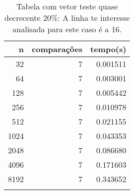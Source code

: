 \begin{table}[ht]
\centering
\begin{tabular}{rrr} \toprule
        n &    comparações &       tempo(s) \\ \midrule
      32  &              7 &      0.001511 \\
      64  &              7 &      0.003001 \\
     128  &              7 &      0.005442 \\
     256  &              7 &      0.010978 \\
     512  &              7 &      0.021155 \\
    1024  &              7 &      0.043353 \\
    2048  &              7 &      0.086680 \\
    4096  &              7 &      0.171603 \\
    8192  &              7 &      0.343652 \\
\bottomrule\addlinespace
\end{tabular}
\caption{Tabela com vetor teste quase decrecente 20\%: A linha te interesse analisada para este caso é a 16.}
\label{tab:radixsortQuaseDecresc20}
\end{table}
